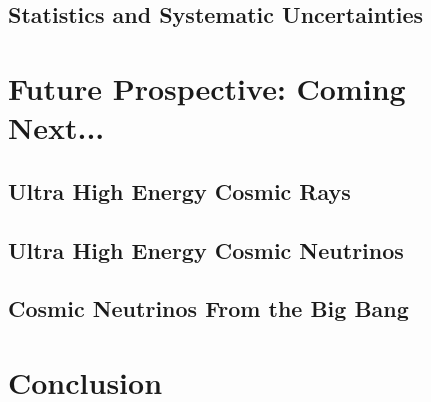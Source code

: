 \documentclass[12pt,twoside,letterpaper]{article}
\begin{document}
\subsection{Statistics and Systematic Uncertainties} 

\section{Future Prospective: Coming Next...} 

\subsection{Ultra High Energy Cosmic Rays} 

\subsection{Ultra High Energy Cosmic Neutrinos} 

\subsection{Cosmic Neutrinos From the Big Bang} 

\section{Conclusion} 

\end{document}

